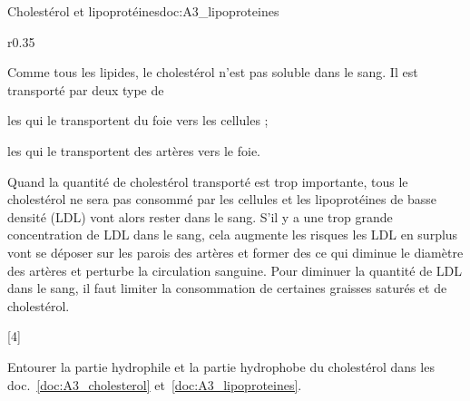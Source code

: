 \begin{doc}{Cholestérol et lipoprotéines}{doc:A3_lipoproteines}
  \begin{wrapfigure}[15]{r}{0.35\linewidth}
    \vspace*{-30pt}
    \centering

  \end{wrapfigure}
  
  Comme tous les lipides, le cholestérol n'est pas soluble dans le sang.
  Il est transporté par deux type de 
  \begin{listePoints}
    \item les  qui le transportent du foie vers les cellules ;
    \item les  qui le transportent des artères vers le foie.
  \end{listePoints}

  Quand la quantité de cholestérol transporté est trop importante, tous le cholestérol ne sera pas consommé par les cellules et les lipoprotéines de basse densité (LDL) vont alors rester dans le sang.
  S'il y a une trop grande concentration de LDL dans le sang, cela augmente les risques  les LDL en surplus vont se déposer sur les parois des artères et former des  ce qui diminue le diamètre des artères et perturbe la circulation sanguine.
  Pour diminuer la quantité de LDL dans le sang, il faut limiter la consommation de certaines graisses saturés et de cholestérol.
\end{doc}

[4]

\numeroQuestion
  Entourer la partie hydrophile et la partie hydrophobe du cholestérol dans les doc.~\ref{doc:A3_cholesterol} et~\ref{doc:A3_lipoproteines}.

